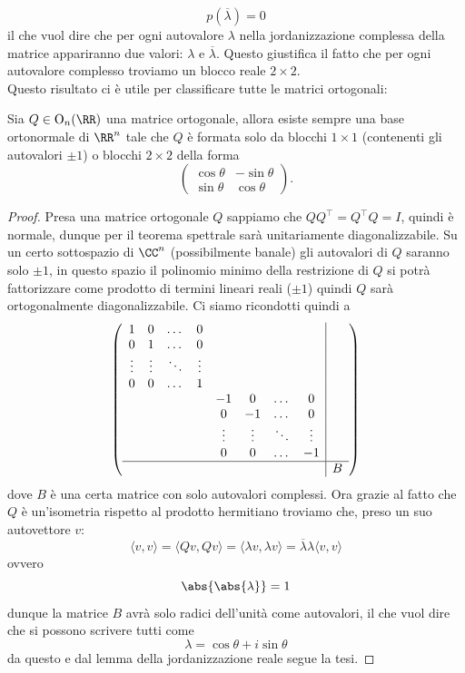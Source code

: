 \documentclass[11pt]{scrartcl}
\begin{document}
   	 $$p\left(\overline{\lambda}\right)=0$$
   	 il che vuol dire che per ogni autovalore $\lambda$ nella jordanizzazione complessa della matrice appariranno due valori: $\lambda$ e $\overline{\lambda}$. Questo giustifica il fatto che per ogni autovalore complesso troviamo un blocco reale $2\times 2$. \\
   	 Questo risultato ci è utile per classificare tutte le matrici ortogonali:
   	 \begin{theorem}
   	 	Sia $Q\in \text{O}_n(\RR)$ una matrice ortogonale, allora esiste sempre una base ortonormale di $\RR^n$ tale che $Q$ è formata solo da blocchi $1\times 1$ (contenenti gli autovalori $\pm1$) o blocchi $2\times 2$ della forma
   	 	$$
   	 	\begin{pmatrix}
   	 		\cos\theta & -\sin\theta \\
   	 		\sin\theta & \cos\theta
   	 	\end{pmatrix}.
   	 	$$  
   	 \end{theorem}
   	 \begin{proof}
   	 	Presa una matrice ortogonale $Q$ sappiamo che $QQ^\intercal=Q^\intercal Q=I$, quindi è normale, dunque per il teorema spettrale sarà unitariamente diagonalizzabile. Su un certo sottospazio di $\CC^n$ (possibilmente banale) gli autovalori di $Q$ saranno solo $\pm 1$, in questo spazio il polinomio minimo della restrizione di $Q$ si potrà fattorizzare come prodotto di termini lineari reali ($\pm 1$) quindi $Q$ sarà ortogonalmente diagonalizzabile. Ci siamo ricondotti quindi a
   	 	$$
   	 	\left(
   	 	\begin{array}{cccccccc|c}
   	 		1 & 0 & \dots & 0 &&&&& \\
   	 		0 & 1 & \dots & 0 &&&&& \\
   	 		\vdots & \vdots & \ddots & \vdots &&&&& \\
   	 		0 & 0 & \dots & 1 &&&&& \\
   	 		&&&& -1 & 0 & \dots & 0 & \\
   	 		&&&& 0 & -1 & \dots & 0 & \\
   	 		&&&& \vdots & \vdots & \ddots & \vdots & \\
   	 		&&&& 0 & 0 & \dots & -1 & \\
   	 		\hline
   	 		&&&&&&&& B 
   	 	\end{array}
   	 	\right)
   	 	$$
   	 	dove $B$ è una certa matrice con solo autovalori complessi. Ora grazie al fatto che $Q$ è un'isometria rispetto al prodotto hermitiano troviamo che, preso un suo autovettore $v$:
   	 	$$\langle v,v\rangle=\langle Qv,Qv\rangle=\langle \lambda v,\lambda v\rangle=\overline{\lambda}\lambda\langle v,v\rangle$$
   	 	ovvero 
   	 	$$\abs{\abs{\lambda}}=1$$
   	 	dunque la matrice $B$ avrà solo radici dell'unità come autovalori, il che vuol dire che si possono scrivere tutti come
   	 	$$\lambda=\cos\theta+i\sin\theta$$
   	 	da questo e dal lemma della jordanizzazione reale segue la tesi.
   	 \end{proof}
   	 \newpage
   	 
\end{document}
